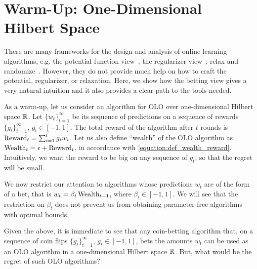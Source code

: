 \section{Warm-Up: One-Dimensional Hilbert Space}
\label{section:one-dimensional-hilbert-space-olo}

There are many frameworks for the design and analysis of online learning
algorithms, e.g. the potential function view~\cite{Cesa-Bianchi-Lugosi-2006},
the regularizer view~\cite{Shalev-Shwartz-2011}, relax and
randomize~\cite{Rakhlin-Shamir-Sridharan-2012}. However, they do not provide
much help on how to craft the potential, regularizer, or relaxation.  Here, we
show how the betting view gives a very natural intuition and it also provides a
clear path to the tools needed.

As a warm-up, let us consider an algorithm for OLO over one-dimensional Hilbert
space $\mathbb{R}$.  Let $\{w_t\}_{t=1}^\infty$ be its sequence of predictions on a
sequence of rewards $\{g_t\}_{t=1}^\infty$, $g_t \in [-1,1]$. The total reward
of the algorithm after $t$ rounds is $\operatorname{Reward}_t = \sum_{i=1}^t g_i w_i$.  Let
us also define ``wealth'' of the OLO algorithm as $\operatorname{Wealth}_t = \epsilon +
\operatorname{Reward}_t$, in accordance with \eqref{equation:def_wealth_reward}.
Intuitively, we want the reward to be big on any sequence of $g_t$, so that the
regret will be small.

We now restrict our attention to algorithms whose predictions $w_t$ are of the
form of a bet, that is $w_t = \beta_t \operatorname{Wealth}_{t-1}$, where $\beta_t \in
[-1,1]$.  We will see that the restriction on $\beta_t$ does not prevent us
from obtaining parameter-free algorithms with optimal bounds.

Given the above, it is immediate to see that any coin-betting algorithm that,
on a sequence of coin flips $\{g_t\}_{t=1}^\infty$, $g_t \in [-1,1]$, bets the
amounts $w_t$ can be used as an OLO algorithm in a one-dimensional Hilbert
space $\mathbb{R}$. But, what would be the regret of such OLO algorithms?

